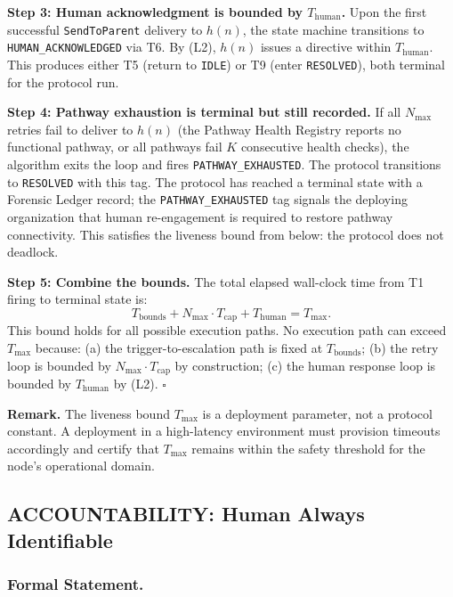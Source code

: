 \medskip
\noindent\textbf{Step 3: Human acknowledgment is bounded by $T_{\text{human}}$.} Upon the first successful \texttt{SendToParent} delivery to $h(n)$, the state machine transitions to \texttt{HUMAN\_ACKNOWLEDGED} via T6. By (L2), $h(n)$ issues a directive within $T_{\text{human}}$. This produces either T5 (return to \texttt{IDLE}) or T9 (enter \texttt{RESOLVED}), both terminal for the protocol run.

\medskip
\noindent\textbf{Step 4: Pathway exhaustion is terminal but still recorded.} If all $N_{\max}$ retries fail to deliver to $h(n)$ (the Pathway Health Registry reports no functional pathway, or all pathways fail $K$ consecutive health checks), the algorithm exits the loop and fires \texttt{PATHWAY\_EXHAUSTED}. The protocol transitions to \texttt{RESOLVED} with this tag. The protocol has reached a terminal state with a Forensic Ledger record; the \texttt{PATHWAY\_EXHAUSTED} tag signals the deploying organization that human re-engagement is required to restore pathway connectivity. This satisfies the liveness bound from below: the protocol does not deadlock.

\medskip
\noindent\textbf{Step 5: Combine the bounds.} The total elapsed wall-clock time from T1 firing to terminal state is:
\[
T_{\text{bounds}} + N_{\max} \cdot T_{\text{cap}} + T_{\text{human}} = T_{\max}.
\]
This bound holds for all possible execution paths. No execution path can exceed $T_{\max}$ because: (a) the trigger-to-escalation path is fixed at $T_{\text{bounds}}$; (b) the retry loop is bounded by $N_{\max} \cdot T_{\text{cap}}$ by construction; (c) the human response loop is bounded by $T_{\text{human}}$ by (L2). $\square$

\medskip
\noindent\textbf{Remark.} The liveness bound $T_{\max}$ is a deployment parameter, not a protocol constant. A deployment in a high-latency environment must provision timeouts accordingly and certify that $T_{\max}$ remains within the safety threshold for the node's operational domain.

\subsection{ACCOUNTABILITY: Human Always Identifiable}

\subsubsection{Formal Statement.}

